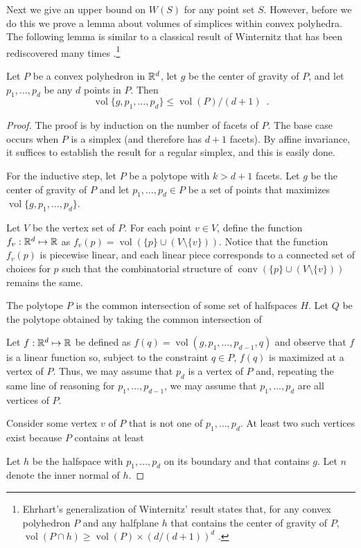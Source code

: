 \documentclass[lotsofwhite]{patmorin}
\DeclareMathOperator{\vol}{vol}
\DeclareMathOperator{\conv}{conv}
\begin{document}
Next we give an upper bound on $W(S)$ for any point set $S$.  However,
before we do this we prove a lemma about volumes of simplices within
convex polyhedra. The following lemma is similar to a classical result
of Winternitz \cite{X} that has been rediscovered many times
\cite{X}.\footnote{Ehrhart's generalization of Winternitz' result
states that, for any convex polyhedron $P$ and any halfplane $h$ that
contains the center of gravity of $P$, $\vol(P\cap h) \ge
\vol(P)\times (d/(d+1))^d$ \cite{eXX}.}

\begin{lem}
Let $P$ be a convex polyhedron in $\mathbb{R}^d$, let $g$ be the center of
gravity of $P$, and let $p_1,\ldots,p_d$ be any $d$ points in $P$. Then
\[
   \vol\{g,p_1,\ldots,p_d\} \le \vol(P) / (d+1) \enspace .
\] 
\end{lem}

\begin{proof}
The proof is by induction on the number of facets of $P$.  The base
case occurs when $P$ is a simplex (and therefore has $d+1$ facets).
By affine invariance, it suffices to establish the result for a
regular simplex, and this is easily done.

For the inductive step, let $P$ be a polytope with $k > d+1$ facets.
Let $g$ be the center of gravity of $P$ and let $p_1,\ldots,p_d\in P$
be a set of points that maximizes $\vol\{g,p_1,\ldots,p_d\}$. 

Let $V$ be the vertex set of $P$.  For each point $v\in V$, define the
function $f_v:\mathbb{R}^d\mapsto\mathbb{R}$ as $f_v(p)=\vol(\{p\}\cup
(V\setminus\{v\}))$.  Notice that the function $f_v(p)$ is piecewise
linear, and each linear piece corresponds to a connected set of
choices for $p$ such that the combinatorial structure of $\conv(\{p\}\cup
(V\setminus\{v\}))$ remains the same.


  The polytope $P$ is the common intersection of
some set of halfspaces $H$.  Let $Q$ be the polytope obtained by
taking the common intersection of 





Let
$f:\mathbb{R}^d\mapsto \mathbb{R}$ be defined as $f(q)=\vol(g,p_1,\ldots,p_{d-1},q)$
and observe that $f$ is a linear function so, subject to the
constraint $q\in P$, $f(q)$ is maximized at a vertex of $P$.  Thus, we
may assume that $p_d$ is a vertex of $P$ and, repeating the same line
of reasoning for $p_1,\ldots,p_{d-1}$, we may assume that
$p_1,\ldots,p_{d}$ are all vertices of $P$.

Consider some vertex $v$ of $P$ that is not one of $p_1,\ldots,p_d$.
At least two such vertices exist because $P$ contains at least 

Let $h$ be the halfspace with $p_1,\ldots,p_d$ on its boundary and
that contains $g$.  Let $n$ denote the inner normal of $h$.

\end{proof}
\end{document}
